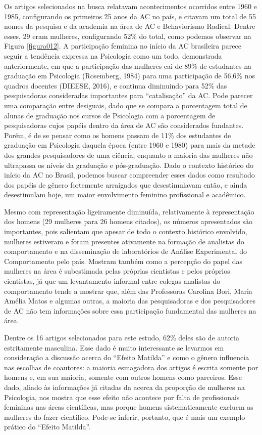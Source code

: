 Os artigos selecionados na busca relatavam acontecimentos ocorridos entre 1960 e 1985, configurando os primeiros 25 anos da AC no país, e citavam um total de 55 nomes da pesquisa e da academia na área de AC e Behaviorismo Radical. Dentre esses, 29 eram mulheres, configurando 52\% do total, como podemos observar na Figura \ref{figura012}. A participação feminina no início da AC brasileira parece seguir a tendência expressa na Psicologia como um todo, demonstrada anteriormente, em que a participação das mulheres cai de 89\% de estudantes na graduação em Psicologia (Rosemberg, 1984) para uma participação de 56,6\% nos quadros docentes (DIEESE, 2016), e continua diminuindo para 52\% das pesquisadoras consideradas importantes para ``catalisação'' da AC. Pode parecer uma comparação entre desiguais, dado que se compara a porcentagem total de alunas de graduação nos cursos de Psicologia com a porcentagem de pesquisadoras cujos papéis dentro da área de AC são considerados fundantes. Porém, é de se pensar como os homens passam de 11\% dos estudantes de graduação em Psicologia daquela época (entre 1960 e 1980) para mais da metade dos grandes pesquisadores de uma ciência, enquanto a maioria das mulheres não ultrapassa os níveis da graduação e pós-graduação. Dado o contexto histórico do início da AC no Brasil, podemos buscar compreender esses dados como resultado dos papéis de gênero fortemente arraigados que desestimulavam então, e ainda desestimulam hoje, um maior envolvimento feminino profissional e acadêmico.

Mesmo com representação ligeiramente diminuída, relativamente à representação dos homens (29 mulheres para 26 homens citados), os números apresentados são importantes, pois salientam que apesar de todo o contexto histórico envolvido, mulheres estiveram e foram presentes ativamente na formação de analistas do comportamento e na disseminação de laboratórios de Análise Experimental do Comportamento pelo país. Mostram também como a percepção do papel das mulheres na área é subestimada pelas próprias cientistas e pelos próprios cientistas, já que um levantamento informal entre colegas analistas do comportamento tende a mostrar que, além das Professoras Carolina Bori, Maria Amélia Matos e algumas outras, a maioria das pesquisadoras e dos pesquisadores de AC não tem informações sobre essa participação fundamental das mulheres na área.

Dentre os 16 artigos selecionados para este estudo, 62\% deles são de autoria estritamente masculina. Esse dado é muito interessante se levarmos em consideração a discussão acerca do ``Efeito Matilda'' e como o gênero influencia nas escolhas de coautores: a maioria esmagadora dos artigos é escrita somente por homens e, em sua maioria, somente com outros homens como parceiros. Esse dado, aliado às informações já citadas da acerca da proporção de mulheres na Psicologia, nos mostra que esse efeito não acontece por falta de profissionais femininas nas áreas científicas, mas porque homens sistematicamente excluem as mulheres do fazer científico. Pode-se inferir, portanto, que é mais um exemplo prático do ``Efeito Matilda''.

